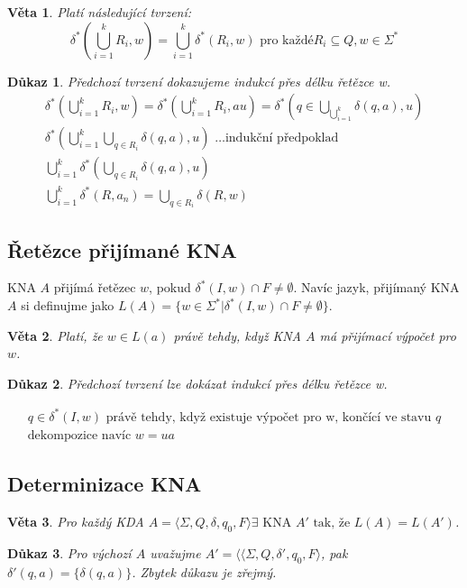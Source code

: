 \documentclass[10pt, a4paper, titlepage]{article}
\theoremstyle{note}
\newtheorem{veta}{Věta}
\newtheorem{dukaz}{Důkaz}
\begin{document}
\begin{veta}
Platí následující tvrzení:
$$
\delta^{*}(\bigcup\limits_{i=1}^{k} R_{i},w) = \bigcup\limits_{i=1}^{k} \delta^{*}(R_{i},w) \text{ pro každé} R_{i} \subseteq Q, w \in \Sigma^{*}
$$
\end{veta}
\begin{dukaz}
Předchozí tvrzení dokazujeme indukcí přes délku řetězce w.
\begin{gather*}
\delta^{*}(\bigcup\limits_{i=1}^{k}R_{i},w) = \delta^{*}(\bigcup\limits_{i=1}^{k}R_{i},au) = \delta^{*}(q \in \bigcup\limits_{\bigcup_{i=1}^{k}} \delta(q, a), u) \\
\delta^{*}(\bigcup\limits_{i=1}^{k}\bigcup\limits_{q \in R_{i}} \delta(q,a),u) \text{ \ldots indukční předpoklad} \\
\bigcup\limits_{i=1}^{k} \delta^{*}(\bigcup\limits_{q \in R_{i}} \delta(q,a),u) \\
\bigcup\limits_{i=1}^{k} \delta^{*}(R,a_{n}) = \bigcup\limits_{q \in R_{i}} \delta(R,w)
\end{gather*}
\end{dukaz}

\subsection{Řetězce přijímané KNA}
KNA $A$ přijímá řetězec $w$, pokud $\delta^{*}(I,w) \cap F \neq \emptyset$.
Navíc jazyk, přijímaný KNA $A$ si definujme jako $L(A) = \lbrace w \in \Sigma^{*} | \delta^{*}(I,w) \cap F \neq \emptyset \rbrace$.

\begin{veta}
Platí, že $w \in L(a)$ právě tehdy, když KNA $A$ má přijímací výpočet pro $w$.
\end{veta}
\begin{dukaz}
Předchozí tvrzení lze dokázat indukcí přes délku řetězce w.

\begin{gather*}
q \in \delta^{*}(I,w) \text{ právě tehdy, když existuje výpočet pro w, končící ve stavu } q \\
\text{dekompozice navíc } w = ua
\end{gather*}
\end{dukaz}

\subsection{Determinizace KNA}
\begin{veta}
Pro každý KDA $A=\langle \Sigma, Q, \delta, q_{0}, F \rangle \exists \text{ KNA } A' \text{ tak, že } L(A)=L(A') $.
\end{veta}
\begin{dukaz}
Pro výchozí $A$ uvažujme $A'=\langle \langle \Sigma, Q, \delta', q_{0}, F \rangle$, pak $\delta'(q,a) = \lbrace \delta(q,a) \rbrace$. Zbytek důkazu je zřejmý.
\end{dukaz}
\end{document}
